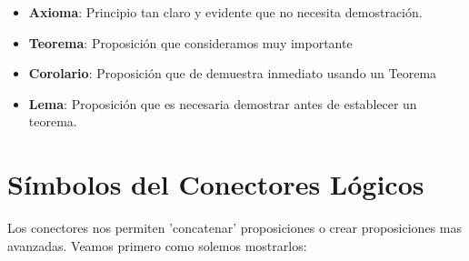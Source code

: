 \documentclass[12pt, fleqn]{report}                             %
\begin{document}
                \begin{itemize}
                    \item \textbf{Axioma}:
                        Principio tan claro y evidente que no necesita demostración.

                    \item \textbf{Teorema}:
                        Proposición que consideramos muy importante

                    \item \textbf{Corolario}:
                        Proposición que de demuestra inmediato usando un Teorema

                    \item \textbf{Lema}:
                        Proposición que es necesaria demostrar antes de establecer un teorema.

                \end{itemize}




        \clearpage
        \section{Símbolos del Conectores Lógicos}

            Los conectores nos permiten 'concatenar' proposiciones o crear proposiciones mas avanzadas. 
            Veamos primero como solemos mostrarlos:
\end{document}
